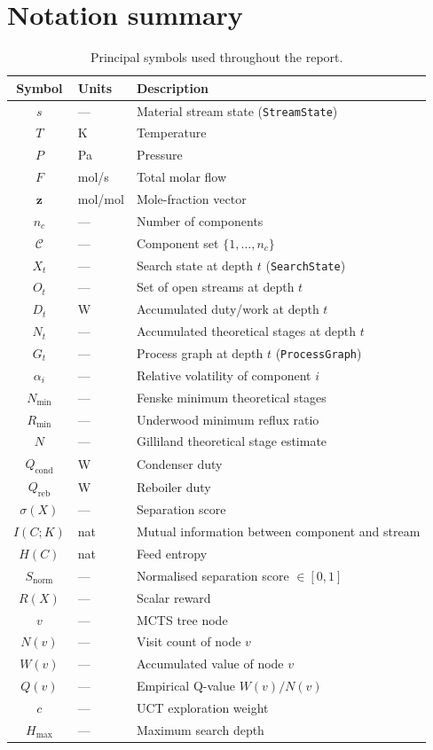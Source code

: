 \documentclass[11pt,a4paper]{article}
\theoremstyle{definition}
\theoremstyle{plain}
\newcommand{\StreamState}{\texttt{StreamState}}
\newcommand{\SearchState}{\texttt{SearchState}}
\newcommand{\ProcessGraph}{\texttt{ProcessGraph}}
\newcommand{\calC}{\mathcal{C}}
\begin{document}
\appendix

\section{Notation summary}
\label{app:notation}

\begin{table}[ht]
\centering
\caption{Principal symbols used throughout the report.}
\label{tab:notation}
\begin{tabular}{@{}cll@{}}
\toprule
Symbol & Units & Description \\
\midrule
$s$ & --- & Material stream state (\StreamState{}) \\
$T$ & K & Temperature \\
$P$ & Pa & Pressure \\
$F$ & mol/s & Total molar flow \\
$\bm{z}$ & mol/mol & Mole-fraction vector \\
$n_c$ & --- & Number of components \\
$\calC$ & --- & Component set $\{1,\ldots,n_c\}$ \\
$X_t$ & --- & Search state at depth $t$ (\SearchState{}) \\
$O_t$ & --- & Set of open streams at depth $t$ \\
$D_t$ & W & Accumulated duty/work at depth $t$ \\
$N_t$ & --- & Accumulated theoretical stages at depth $t$ \\
$G_t$ & --- & Process graph at depth $t$ (\ProcessGraph{}) \\
$\alpha_i$ & --- & Relative volatility of component $i$ \\
$N_{\min}$ & --- & Fenske minimum theoretical stages \\
$R_{\min}$ & --- & Underwood minimum reflux ratio \\
$N$ & --- & Gilliland theoretical stage estimate \\
$Q_{\mathrm{cond}}$ & W & Condenser duty \\
$Q_{\mathrm{reb}}$ & W & Reboiler duty \\
$\sigma(X)$ & --- & Separation score \\
$I(C;K)$ & nat & Mutual information between component and stream \\
$H(C)$ & nat & Feed entropy \\
$S_{\mathrm{norm}}$ & --- & Normalised separation score $\in [0,1]$ \\
$R(X)$ & --- & Scalar reward \\
$v$ & --- & MCTS tree node \\
$N(v)$ & --- & Visit count of node $v$ \\
$W(v)$ & --- & Accumulated value of node $v$ \\
$Q(v)$ & --- & Empirical Q-value $W(v)/N(v)$ \\
$c$ & --- & UCT exploration weight \\
$H_{\max}$ & --- & Maximum search depth \\
\bottomrule
\end{tabular}
\end{table}
\end{document}
